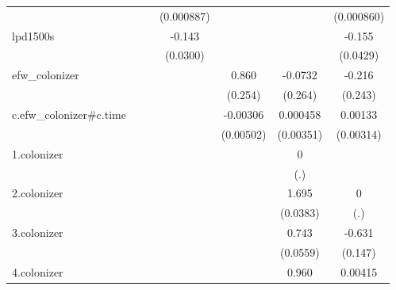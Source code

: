 {\begin{tabular}{l*{6}{c}}
            &                     &                     &  (0.000887)         &                     &                     &  (0.000860)         \\
[1em]
lpd1500s    &                     &                     &      -0.143\sym{***}&                     &                     &      -0.155\sym{**} \\
            &                     &                     &    (0.0300)         &                     &                     &    (0.0429)         \\
[1em]
efw\_colonizer&                     &                     &                     &       0.860\sym{**} &     -0.0732         &      -0.216         \\
            &                     &                     &                     &     (0.254)         &     (0.264)         &     (0.243)         \\
[1em]
c.efw\_colonizer#c.time&                     &                     &                     &    -0.00306         &    0.000458         &     0.00133         \\
            &                     &                     &                     &   (0.00502)         &   (0.00351)         &   (0.00314)         \\
[1em]
1.colonizer &                     &                     &                     &                     &           0         &                     \\
            &                     &                     &                     &                     &         (.)         &                     \\
[1em]
2.colonizer &                     &                     &                     &                     &       1.695\sym{***}&           0         \\
            &                     &                     &                     &                     &    (0.0383)         &         (.)         \\
[1em]
3.colonizer &                     &                     &                     &                     &       0.743\sym{***}&      -0.631\sym{***}\\
            &                     &                     &                     &                     &    (0.0559)         &     (0.147)         \\
[1em]
4.colonizer &                     &                     &                     &                     &       0.960\sym{***}&     0.00415         \\

\end{tabular}}
